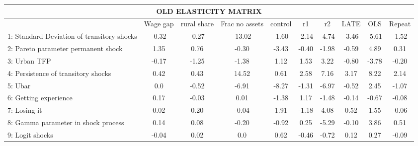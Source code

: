 \documentclass[pdftex,11pt]{article}
\renewcommand{\arraystretch}{.7}
\begin{document}
\begin{landscape}
\centering

\begin{table}
\footnotesize
\setlength {\tabcolsep}{1.5mm}
\renewcommand{\arraystretch}{2.25}
\begin{center}\label{tb:employment}
\begin{tabular}{l c c c c c c c c c}
\multicolumn{10}{c}{OLD ELASTICITY MATRIX} \\
\hline
\hline
&  Wage gap & rural share &  Frac no assets & control & r1 & r2 & LATE & OLS & Repeat \\
1: Standard Deviation of transitory shocks& -0.32   &  -0.27   &  -13.02  &  -1.60  &  -2.14 &  -4.74  &   -3.46  & -5.61 &   -1.52\\
2: Pareto parameter permanent shock       &  1.35   &   0.76   &   -0.30  &  -3.43  &  -0.40 &  -1.98  &   -0.59  &  4.89 &    0.31\\
3: Urban TFP                              & -0.17   &  -1.25   &   -1.38  &   1.12  &   1.53 &   3.22  &   -0.80  & -3.78 &   -0.20\\
4: Persistence of transitory shocks       &  0.42   &   0.43   &   14.52  &   0.61  &   2.58 &   7.16  &    3.17  &  8.22 &    2.14\\
5: Ubar                                   &  0.0    &  -0.52   &   -6.91  &  -8.27  &  -1.31 &  -6.97  &   -0.52  &  2.45 &   -1.07\\
6: Getting experience                     &  0.17   &  -0.03   &    0.01  &  -1.38  &   1.17 &  -1.48  &   -0.14  & -0.67 &   -0.08\\
7: Losing it                              &  0.02   &   0.20   &   -0.04  &   1.91  &  -1.18 &   4.08  &    0.52  &  1.55 &   -0.06\\
8: Gamma parameter in shock process       &  0.14   &   0.08   &   -0.20  &  -0.92  &   0.25 &  -5.29  &   -0.10  &  3.86 &    0.51\\
9: Logit shocks                           & -0.04   &   0.02   &    0.0   &   0.62  &  -0.46 &  -0.72  &    0.12  &  0.27 &   -0.09\\
\hline
\hline
\end{tabular}
\end{center}
\end{table}

\end{landscape}
\end{document}
